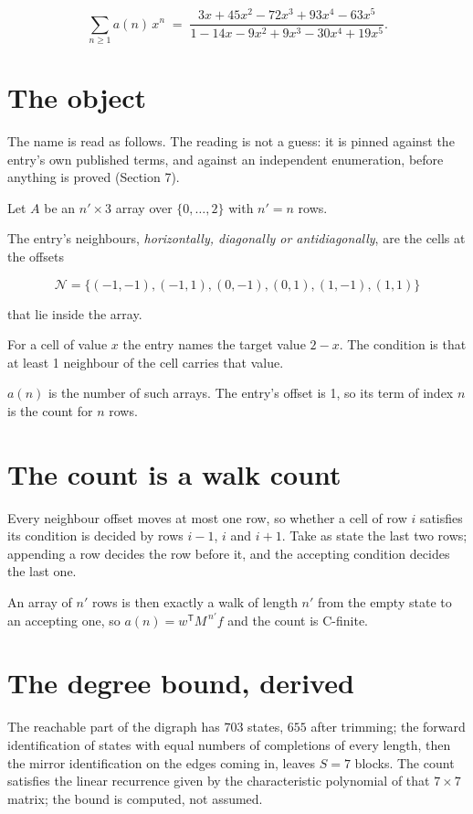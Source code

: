 \documentclass[11pt]{article}
\theoremstyle{definition}
\begin{document}
\[\sum_{n \ge 1} a(n)\,x^n \;=\; \frac{3x + 45x^{2} - 72x^{3} + 93x^{4} - 63x^{5}}{1 - 14x - 9x^{2} + 9x^{3} - 30x^{4} + 19x^{5}}.\]

\section{The object}

The name is read as follows. The reading is not a guess: it is pinned against the entry's own published terms, and against an independent enumeration, before anything is proved (Section 7).

Let $A$ be an $n' \times 3$ array over $\{0,\dots,2\}$ with $n' = n$ rows.

The entry's neighbours, {\itshape horizontally, diagonally or antidiagonally}, are the cells at the offsets

\[\mathcal{N} = \{(-1,-1), (-1,1), (0,-1), (0,1), (1,-1), (1,1)\}\]

that lie inside the array.

For a cell of value $x$ the entry names the target value $2 - x$. The condition is that at least 1 neighbour of the cell carries that value.

$a(n)$ is the number of such arrays. The entry's offset is 1, so its term of index $n$ is the count for $n$ rows.

\section{The count is a walk count}

Every neighbour offset moves at most one row, so whether a cell of row $i$ satisfies its condition is decided by rows $i-1$, $i$ and $i+1$. Take as state the last two rows; appending a row decides the row before it, and the accepting condition decides the last one.

An array of $n'$ rows is then exactly a walk of length $n'$ from the empty state to an accepting one, so $a(n) = w^{\mathsf T}M^{\,n'}f$ and the count is C-finite.

\section{The degree bound, derived}

The reachable part of the digraph has $703$ states, $655$ after trimming; the forward identification of states with equal numbers of completions of every length, then the mirror identification on the edges coming in, leaves $S = 7$ blocks. The count satisfies the linear recurrence given by the characteristic polynomial of that $7\times7$ matrix; the bound is computed, not assumed.
\end{document}
